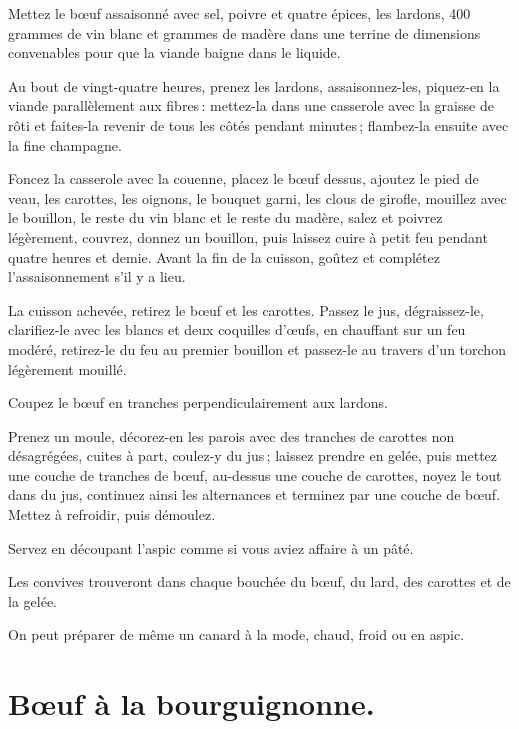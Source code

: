 Mettez le bœuf assaisonné avec sel, poivre et quatre épices, les lardons, 400
grammes de vin blanc et {\mmm} grammes de madère dans une terrine de dimensions
convenables pour que la viande baigne dans le liquide.

Au bout de vingt-quatre heures, prenez les lardons, assaisonnez-les, piquez-en
la viande parallèlement aux fibres : mettez-la dans une casserole avec la
graisse de rôti et faites-la revenir de tous les côtés pendant {\mmm} minutes ;
flambez-la ensuite avec la fine champagne.

Foncez la casserole avec la couenne, placez le bœuf dessus, ajoutez le pied de
veau, les carottes, les oignons, le bouquet garni, les clous de girofle,
mouillez avec le bouillon, le reste du vin blanc et le reste du madère, salez
et poivrez légèrement, couvrez, donnez un bouillon, puis laissez cuire à petit
feu pendant quatre heures et demie. Avant la fin de la cuisson, goûtez et
complétez l'assaisonnement s'il y a lieu.

La cuisson achevée, retirez le bœuf et les carottes. Passez le jus,
dégraissez-le, clarifiez-le avec les blancs et deux coquilles d'œufs, en
chauffant sur un feu modéré, retirez-le du feu au premier bouillon et passez-le
au travers d'un torchon légèrement mouillé.

Coupez le bœuf en tranches perpendiculairement aux lardons.

Prenez un moule, décorez-en les parois avec des tranches de carottes non
désagrégées, cuites à part, coulez-y du jus ; laissez prendre en gelée, puis mettez
une couche de tranches de bœuf, au-dessus une couche de carottes, noyez le tout
dans du jus, continuez ainsi les alternances et terminez par une couche de bœuf.
Mettez à refroidir, puis démoulez.

Servez en découpant l'aspic comme si vous aviez affaire à un pâté.

Les convives trouveront dans chaque bouchée du bœuf, du lard, des carottes et
de la gelée.

\sk
{}

On peut préparer de même un canard à la mode, chaud, froid ou en aspic.

\section*{\centering Bœuf à la bourguignonne.}
{}

